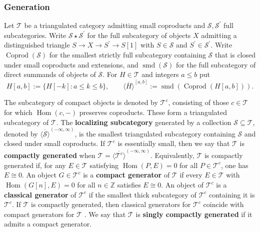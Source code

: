 \documentclass[11pt]{amsart}
\theoremstyle{plain}
\theoremstyle{definition}
\numberwithin{equation}{section}
\numberwithin{theorem}{section}
\begin{document}
\subsubsection{Generation}
\label{sec:prelim_generation}

Let $\mathcal{T}$ be a triangulated category admitting small coproducts and $\mathcal{S},\mathcal{S}^\prime$ full subcategories.
Write $\mathcal{S} \star \mathcal{S}^\prime$ for the full subcategory of objects $X$ admitting a distinguished triangle $S\to X\to S^\prime \to S[1]$ with $S\in \mathcal{S}$ and $S^\prime \in \mathcal{S}^\prime$.
Write $\operatorname{Coprod}(\mathcal{S})$ for the smallest strictly full subcategory containing $\mathcal{S}$ that is closed under small coproducts and extensions, and $\operatorname{smd}(\mathcal{S})$ for the full subcategory of direct summands of objects of $\mathcal{S}$.
For $H\in \mathcal{T}$ and integers $a\leq b$ put
\begin{displaymath}
    H[a,b] := \{ H[-k] : a\leq k\leq b \},
    \qquad 
    \overline{\langle H\rangle}^{[a,b]} := \operatorname{smd}(\operatorname{Coprod}(H[a,b])).
\end{displaymath}

The subcategory of compact objects is denoted by $\mathcal{T}^c$, consisting of those $c \in \mathcal{T}$ for which $\operatorname{Hom}(c,-)$ preserves coproducts.
These form a triangulated subcategory of $\mathcal{T}$. 
The \textbf{localizing subcategory} generated by a collection $\mathcal{S}\subseteq \mathcal{T}$, denoted by $\overline{\langle \mathcal{S} \rangle}^{(-\infty,\infty)}$, is the smallest triangulated subcategory containing $\mathcal{S}$ and closed under small coproducts.
If $\mathcal{T}^c$ is essentially small, then we say that $\mathcal{T}$ is \textbf{compactly generated} when $\mathcal{T} = \overline{\langle \mathcal{T}^c \rangle}^{(-\infty,\infty)}$.
Equivalently, $\mathcal{T}$ is compactly generated if, for any $E \in \mathcal{T}$ satisfying $\operatorname{Hom}(P, E) = 0$ for all $P \in \mathcal{T}^c$, one has $E \cong 0$.
An object $G\in \mathcal{T}^c$ is a \textbf{compact generator} of $\mathcal{T}$ if every $E\in \mathcal{T}$ with $\operatorname{Hom}(G[n],E)=0$ for all $n\in \mathbb{Z}$ satisfies $E\cong 0$.
An object of $\mathcal{T}^c$ is a \textbf{classical generator} of $\mathcal{T}^c$ if the smallest thick subcategory of $\mathcal{T}^c$ containing it is $\mathcal{T}^c$.
If $\mathcal{T}$ is compactly generated, then classical generators for $\mathcal{T}^c$ coincide with compact generators for $\mathcal{T}$ \cite[\href{https://stacks.math.columbia.edu/tag/09SR}{Tag 09SR}]{StacksProject}.
We say that $\mathcal{T}$ is \textbf{singly compactly generated} if it admits a compact generator. 
\end{document}
